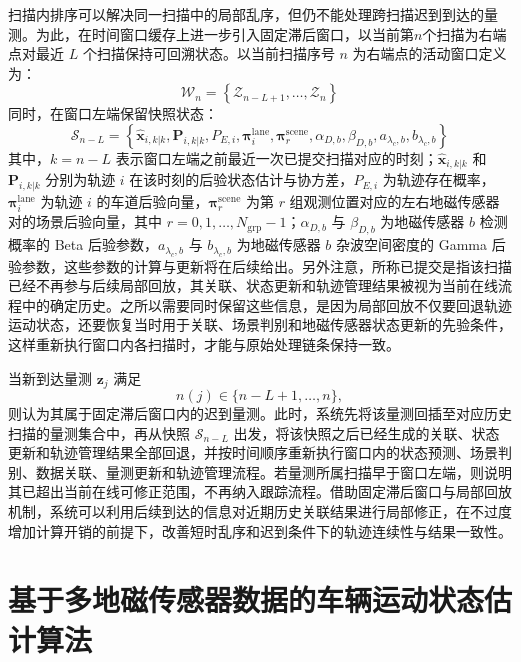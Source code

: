 \documentclass{xdupgthesis}
\begin{document}
扫描内排序可以解决同一扫描中的局部乱序，但仍不能处理跨扫描迟到到达的量测。为此，在时间窗口缓存上进一步引入固定滞后窗口，以当前第$n$个扫描为右端点对最近 $L$ 个扫描保持可回溯状态。以当前扫描序号 $n$ 为右端点的活动窗口定义为：
\begin{equation}
	\mathcal W_n=
	\left\{
	\mathcal Z_{n-L+1},\ldots,\mathcal Z_n
	\right\}
	\label{eq:ch3_lag_window}
\end{equation}
同时，在窗口左端保留快照状态：
\begin{equation}
	\mathcal S_{n-L}=
	\left\{
	\hat{\mathbf x}_{i,k|k},\mathbf P_{i,k|k},P_{E,i},
	\boldsymbol\pi_i^{\mathrm{lane}},
	\boldsymbol\pi_r^{\mathrm{scene}},
	\alpha_{D,b},\beta_{D,b},a_{\lambda_c,b},b_{\lambda_c,b}
	\right\}
	\label{eq:ch3_snapshot_reorg}
\end{equation}
其中，$k=n-L$ 表示窗口左端之前最近一次已提交扫描对应的时刻；$\hat{\mathbf x}_{i,k|k}$ 和 $\mathbf P_{i,k|k}$ 分别为轨迹 $i$ 在该时刻的后验状态估计与协方差，$P_{E,i}$ 为轨迹存在概率，$\boldsymbol\pi_i^{\mathrm{lane}}$ 为轨迹 $i$ 的车道后验向量，$\boldsymbol\pi_r^{\mathrm{scene}}$ 为第 $r$ 组观测位置对应的左右地磁传感器对的场景后验向量，其中 $r=0,1,\ldots,N_{\mathrm{grp}}-1$；$\alpha_{D,b}$ 与 $\beta_{D,b}$ 为地磁传感器 $b$ 检测概率的 Beta 后验参数，$a_{\lambda_c,b}$ 与 $b_{\lambda_c,b}$ 为地磁传感器 $b$ 杂波空间密度的 Gamma 后验参数，这些参数的计算与更新将在后续给出。另外注意，所称已提交是指该扫描已经不再参与后续局部回放，其关联、状态更新和轨迹管理结果被视为当前在线流程中的确定历史。之所以需要同时保留这些信息，是因为局部回放不仅要回退轨迹运动状态，还要恢复当时用于关联、场景判别和地磁传感器状态更新的先验条件，这样重新执行窗口内各扫描时，才能与原始处理链条保持一致。

当新到达量测 $\mathbf z_j$ 满足
\begin{equation}
	n(j)\in\{n-L+1,\ldots,n\},
	\label{eq:ch3_late_condition}
\end{equation}
则认为其属于固定滞后窗口内的迟到量测。此时，系统先将该量测回插至对应历史扫描的量测集合中，再从快照 $\mathcal S_{n-L}$ 出发，将该快照之后已经生成的关联、状态更新和轨迹管理结果全部回退，并按时间顺序重新执行窗口内的状态预测、场景判别、数据关联、量测更新和轨迹管理流程。若量测所属扫描早于窗口左端，则说明其已超出当前在线可修正范围，不再纳入跟踪流程。借助固定滞后窗口与局部回放机制，系统可以利用后续到达的信息对近期历史关联结果进行局部修正，在不过度增加计算开销的前提下，改善短时乱序和迟到条件下的轨迹连续性与结果一致性。

\section{基于多地磁传感器数据的车辆运动状态估计算法}
\label{sec:ch3_state_estimation}
\end{document}
